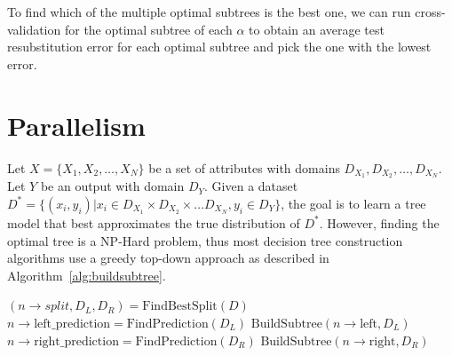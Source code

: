 To find which of the multiple optimal subtrees is the best one, we can run
cross-validation for the optimal subtree of each $\alpha$ to obtain an average
test resubstitution error for each optimal subtree and pick the one with the
lowest error.


\section{Parallelism} %
\label{sec:parallelism}

Let $X = \{X_1, X_2, \dots, X_N\}$ be a set of attributes with domains
$D_{X_1}, D_{X_2}, \dots, D_{X_N}$. Let $Y$ be an output with domain $D_Y$.
Given a dataset $D^* = \{(x_i, y_i) | x_i \in D_{X_1} \times D_{X_2} \times \dots D_{X_N}, y_i \in D_Y\}$,
the goal is to learn a tree model that best approximates the true
distribution of $D^*$. However, finding the optimal tree is a NP-Hard problem,
thus most decision tree construction algorithms use a greedy top-down approach
as described in Algorithm~\ref{alg:buildsubtree}.

\begin{algorithm}[BuildSubtree$(n, D)$] \label{alg:buildsubtree}
\begin{algorithmic}[1]
    \State $\left(n \rightarrow split, D_L, D_R \right) = \text{FindBestSplit}(D)$
        \State $n \rightarrow \text{left\_prediction} = \text{FindPrediction}(D_L)$
    \Else
        \State $\text{BuildSubtree}(n \rightarrow \text{left}, D_L)$
    \EndIf
        \State $n \rightarrow \text{right\_prediction} = \text{FindPrediction}(D_R)$
    \Else
        \State $\text{BuildSubtree}(n \rightarrow \text{right}, D_R)$
    \EndIf
\end{algorithmic}
\end{algorithm}


